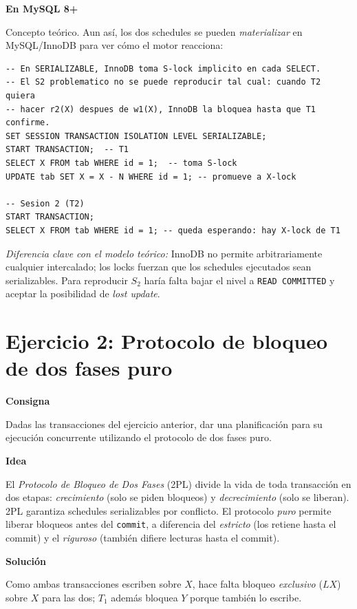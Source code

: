 \documentclass[11pt,a4paper]{article}
\newcommand{\itemcabecera}[1]{\noindent\textbf{#1}\par\medskip}
\newcommand{\bloqueConsigna}{\itemcabecera{Consigna}}
\newcommand{\bloqueIdea}{\itemcabecera{Idea}}
\newcommand{\bloqueSolucion}{\itemcabecera{Soluci\'on}}
\newcommand{\bloqueMySQL}{\itemcabecera{En MySQL 8+}}
\begin{document}
\bloqueMySQL

Concepto teórico. Aun así, los dos schedules se pueden \emph{materializar} en MySQL/InnoDB para ver cómo el motor reacciona:

\begin{lstlisting}
-- En SERIALIZABLE, InnoDB toma S-lock implicito en cada SELECT.
-- El S2 problematico no se puede reproducir tal cual: cuando T2 quiera
-- hacer r2(X) despues de w1(X), InnoDB la bloquea hasta que T1 confirme.
SET SESSION TRANSACTION ISOLATION LEVEL SERIALIZABLE;
START TRANSACTION;  -- T1
SELECT X FROM tab WHERE id = 1;  -- toma S-lock
UPDATE tab SET X = X - N WHERE id = 1; -- promueve a X-lock

-- Sesion 2 (T2)
START TRANSACTION;
SELECT X FROM tab WHERE id = 1; -- queda esperando: hay X-lock de T1
\end{lstlisting}

\textit{Diferencia clave con el modelo teórico:} InnoDB no permite arbitrariamente cualquier intercalado; los locks fuerzan que los schedules ejecutados sean serializables. Para reproducir $S_2$ haría falta bajar el nivel a \texttt{READ COMMITTED} y aceptar la posibilidad de \emph{lost update}.

\section{Ejercicio 2: Protocolo de bloqueo de dos fases puro}

\bloqueConsigna

Dadas las transacciones del ejercicio anterior, dar una planificación para su ejecución concurrente utilizando el protocolo de dos fases puro.

\bloqueIdea

El \emph{Protocolo de Bloqueo de Dos Fases} (2PL) divide la vida de toda transacción en dos etapas: \emph{crecimiento} (solo se piden bloqueos) y \emph{decrecimiento} (solo se liberan). 2PL garantiza schedules serializables por conflicto. El protocolo \emph{puro} permite liberar bloqueos antes del \texttt{commit}, a diferencia del \emph{estricto} (los retiene hasta el commit) y el \emph{riguroso} (también difiere lecturas hasta el commit).

\bloqueSolucion

Como ambas transacciones escriben sobre $X$, hace falta bloqueo \emph{exclusivo} ($LX$) sobre $X$ para las dos; $T_1$ además bloquea $Y$ porque también lo escribe.
\end{document}
